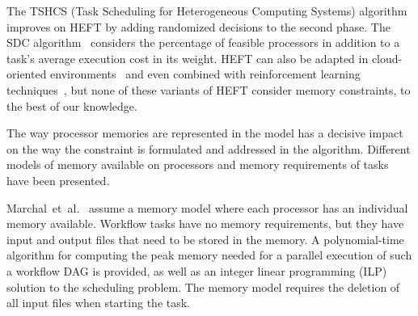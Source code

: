 \documentclass[conference]{IEEEtran}
\begin{document}
The TSHCS (Task Scheduling for Heterogeneous Computing Systems) algorithm~\cite{alebrahim2017task} 
improves on HEFT by adding randomized decisions to the second phase.
The SDC algorithm~\cite{SHI2006665} considers the percentage of feasible processors in addition to a task’s
average execution cost in its weight.
HEFT  can also be adapted in cloud-oriented environments~\cite{samadi2018eheft} and even combined with reinforcement learning techniques~\cite{yano2022cqga}, but none of these variants of HEFT consider memory constraints, 
to the best of our knowledge. 

\medskip
{}
%
The way processor memories are represented in the model has a decisive impact on the way the constraint
is formulated and addressed in the algorithm.
%
Different models of memory available on processors and memory requirements of tasks have been presented.

Marchal~et~al.~\cite{marchal2018parallel} assume a memory model where each processor has an individual memory available.
Workflow tasks have no memory requirements, but they have input and output files that need to be stored in the memory.
A polynomial-time algorithm for computing the peak memory needed for a parallel execution of such a workflow DAG is provided,
as well as an integer linear programming (ILP) solution to the scheduling problem.
The memory model requires the deletion of all input files when starting the task.
\end{document}

